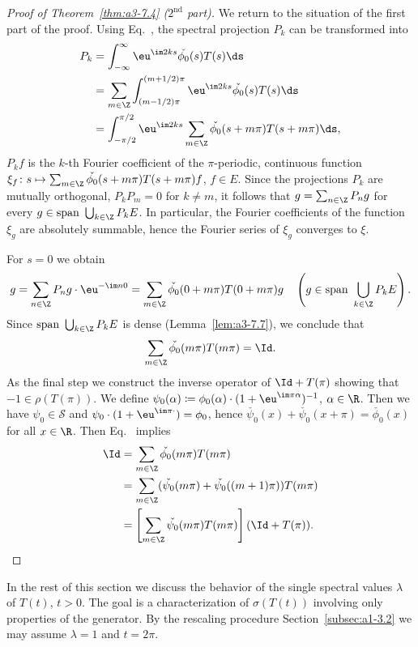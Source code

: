 \begin{proof}[Proof of Theorem~\ref{thm:a3-7.4} ($ 2^{\text{nd}} $ part)]
We return to the situation of the first part of the proof.
Using Eq.~, the spectral projection $P_{k}$ can be transformed into
\begin{align*}
P_{k} &= \int_{-\infty}^{\infty} \eu^{\im 2ks}\check{\phi_{0}}(s)T(s)\ds \\
&= \sum_{m\in\Z} \int_{(m-1/2)\pi}^{(m+1/2)\pi} \eu^{\im 2ks}\check{\phi_{0}}(s)T(s)\ds \\
&= \int_{-\pi/2}^{\pi/2} \eu^{\im 2ks}\sum_{m\in\Z}\check{\phi_{0}}(s+m\pi)T(s+m\pi)\ds ,
\end{align*}
\ie $P_{k}f$ is the $k$-th Fourier coefficient of the $\pi$-periodic, continuous function $\xi_{f} \colon s \mapsto \sum_{m\in\Z} \check{\phi_{0}}(s+m\pi)T(s+m\pi)f$, $f \in E$.
Since the projections $P_{k}$ are mutually orthogonal, \ie $P_{k}P_{m} = 0$ for $k \neq m$, it follows that $g = \sum_{n\in\Z} P_{n}g$ for every $g \in \text{span }\bigcup_{k\in\Z} P_{k}E$.
In particular, the Fourier coefficients of the function $\xi_{g}$ are absolutely summable, hence the Fourier series of\/ $\xi_{g}$ converges to $\xi$.

For $s = 0$ we obtain
\[
g = \sum_{n\in\Z} P_{n}g\cdot \eu^{-\im n0} = \sum_{m\in\Z} \check{\phi_{0}}(0 + m\pi)T(0 + m\pi)g \quad 
\left(g \in \text{span }\bigcup_{k\in\Z} P_{k}E\right) .
\]
Since $\text{span }\bigcup_{k\in\Z} P_{k}E$ is dense (Lemma~\ref{lem:a3-7.7}), we conclude that
\begin{equation}\label{eq:a3-7.6}
\sum_{m\in\Z} \check{\phi_{0}}(m\pi)T(m\pi) = \Id .
\end{equation}
As the final step we construct the inverse operator of\/ $\Id + T(\pi)$ showing that $-1 \in \rho(T(\pi))$.
We define $\psi_{0}(\alpha) \coloneqq \phi_{0}(\alpha)\cdot(1 + \eu^{\im\pi\alpha})^{-1}$, $\alpha \in \R$.
Then we have $\psi_{0} \in \mathcal{S}$ and $\psi_{0}\cdot(1 + \eu^{\im\pi\cdot}) = \phi_{0}$,
hence $\check{\psi_{0}}(x) + \check{\psi_{0}}(x + \pi) = \check{\phi_{0}}(x)$ for all $x \in \R$.
Then Eq.~ implies
\begin{align*}
\Id &= \sum_{m\in\Z} \check{\phi_{0}}(m\pi)T(m\pi) \\
&= \sum_{m\in\Z} (\check{\psi_{0}}(m\pi) + \check{\psi_{0}}((m+1)\pi))T(m\pi) \\
&= \left[ \sum_{m\in\Z} \check{\psi_{0}}(m\pi)T(m\pi) \right] (\Id + T(\pi)) .
\end{align*}
\phantom{x}
\end{proof}
In the rest of this section we discuss the behavior of the single spectral values $\lambda$ of\/ $T(t)$, $t > 0$.
The goal is a characterization of\/ $\sigma(T(t))$ involving only properties of the generator.
By the rescaling procedure Section~\ref{subsec:a1-3.2} we may assume $\lambda = 1$ and $t = 2\pi$.

